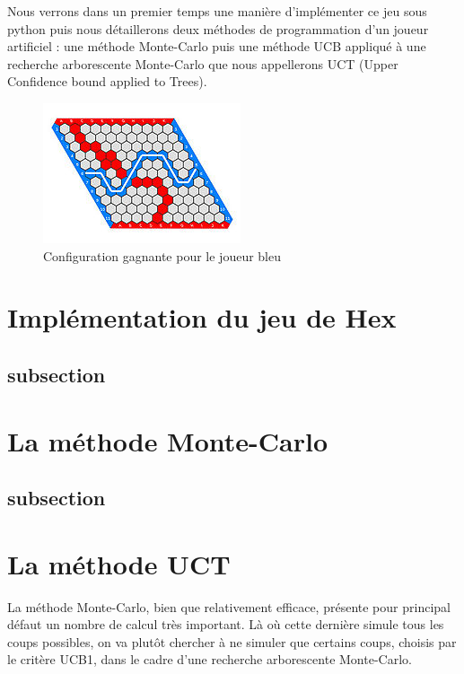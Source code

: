 \documentclass[a4paper]{article}
\theoremstyle{definition}
\begin{document}
Nous verrons dans un premier temps une manière d'implémenter ce jeu sous python puis nous détaillerons deux méthodes de programmation d'un joueur artificiel : une méthode Monte-Carlo puis une méthode UCB appliqué à une recherche arborescente Monte-Carlo que nous appellerons UCT (Upper Confidence bound applied to Trees).

\begin{figure}[h]
\centering
\includegraphics[scale=1]{11x11_gagnant.jpg}
\caption{Configuration gagnante pour le joueur bleu}
\end{figure}




\clearpage

\section{Implémentation du jeu de Hex}

\subsection{subsection}


\clearpage

\section{La méthode Monte-Carlo}


\subsection{subsection}


\clearpage

\section{La méthode UCT}

La méthode Monte-Carlo, bien que relativement efficace, présente pour principal défaut un nombre de calcul très important. Là où cette dernière simule tous les coups possibles, on va plutôt chercher à ne simuler que certains coups, choisis par le critère UCB1, dans le cadre d'une recherche arborescente Monte-Carlo.
\end{document}

